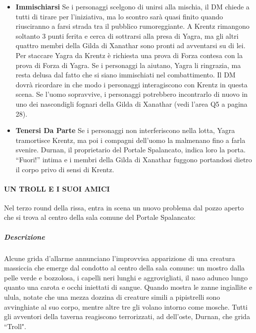 \documentclass{article}
\begin{document}
\begin{itemize}
    \item \textbf{Immischiarsi} Se i personaggi scelgono di unirsi alla mischia, il DM
chiede a tutti di tirare per l'iniziativa, ma lo scontro sarà
quasi finito quando riusciranno a farsi strada tra il pubblico
rumoreggiante. A Krentz rimangono soltanto 3 punti ferita
e cerca di sottrarsi alla presa di Yagra, ma gli altri quattro
membri della Gilda di Xanathar sono pronti ad avventarsi
su di lei.
Per staccare Yagra da Krentz è richiesta una prova
di Forza contesa con la prova di Forza di Yagra. Se i
personaggi la aiutano, Yagra li ringrazia, ma resta delusa
dal fatto che si siano immischiati nel combattimento.
Il DM dovrà ricordare in che modo i personaggi
interagiscono con Krentz in questa scena. Se l’uomo
sopravvive, i personaggi potrebbero incontrarlo di nuovo
in uno dei nascondigli fognari della Gilda di Xanathar (vedi
l’area Q5 a pagina 28).
\item \textbf{Tenersi Da Parte} Se i personaggi non interferiscono nella lotta, Yagra
tramortisce Krentz, ma poi i compagni dell’uomo la
malmenano fino a farla svenire. Durnan, il proprietario del
Portale Spalancato, indica loro la porta. “Fuori!” intima e i
membri della Gilda di Xanathar fuggono portandosi dietro
il corpo privo di sensi di Krentz.

\end{itemize}

\paragraph{UN TROLL E I SUOI AMICI}
Nel terzo round della rissa, entra in scena un nuovo
problema dal pozzo aperto che si trova al centro della sala
comune del Portale Spalancato:

\subparagraph{Descrizione}Alcune grida d'allarme annunciano l'improvvisa
apparizione di una creatura massiccia che emerge
dal condotto al centro della sala comune: un mostro
dalla pelle verde e bozzolosa, i capelli neri lunghi e
aggrovigliati, il naso adunco lungo quanto una carota
e occhi iniettati di sangue. Quando mostra le zanne
ingiallite e ulula, notate che una mezza dozzina di
creature simili a pipistrelli sono avvinghiate al suo corpo,
mentre altre tre gli volano intorno come mosche. Tutti
gli avventori della taverna reagiscono terrorizzati, ad dell'oste, Durnan, che grida “Troll".
\end{document}
